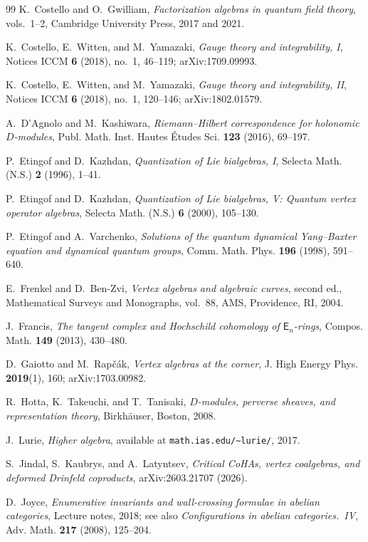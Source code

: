 \documentclass[11pt,reqno]{amsart}
\theoremstyle{definition}
\theoremstyle{remark}
\newcommand{\En}{\mathsf{E}_{n}}
\numberwithin{equation}{section}
\begin{document}
\begin{thebibliography}{99}
K.~Costello and O.~Gwilliam,
\emph{Factorization algebras in quantum field theory},
vols.~1--2, Cambridge University Press, 2017 and 2021.

K.~Costello, E.~Witten, and M.~Yamazaki,
\emph{Gauge theory and integrability, I},
Notices ICCM \textbf{6} (2018), no.~1, 46--119;
arXiv:1709.09993.

K.~Costello, E.~Witten, and M.~Yamazaki,
\emph{Gauge theory and integrability, II},
Notices ICCM \textbf{6} (2018), no.~1, 120--146;
arXiv:1802.01579.

A.~D'Agnolo and M.~Kashiwara,
\emph{Riemann--Hilbert correspondence for holonomic
$D$-modules},
Publ. Math. Inst. Hautes \'Etudes Sci. \textbf{123}
(2016), 69--197.

P.~Etingof and D.~Kazhdan,
\emph{Quantization of Lie bialgebras, I},
Selecta Math. (N.S.) \textbf{2} (1996), 1--41.

P.~Etingof and D.~Kazhdan,
\emph{Quantization of Lie bialgebras, V: Quantum vertex
operator algebras},
Selecta Math. (N.S.) \textbf{6} (2000), 105--130.

P.~Etingof and A.~Varchenko,
\emph{Solutions of the quantum dynamical Yang--Baxter
equation and dynamical quantum groups},
Comm. Math. Phys. \textbf{196} (1998), 591--640.

E.~Frenkel and D.~Ben-Zvi,
\emph{Vertex algebras and algebraic curves},
second ed., Mathematical Surveys and Monographs, vol.~88,
AMS, Providence, RI, 2004.

J.~Francis,
\emph{The tangent complex and Hochschild cohomology of
$\En$-rings},
Compos. Math. \textbf{149} (2013), 430--480.

D.~Gaiotto and M.~Rap\v{c}\'ak,
\emph{Vertex algebras at the corner},
J. High Energy Phys. \textbf{2019}(1), 160;
arXiv:1703.00982.

R.~Hotta, K.~Takeuchi, and T.~Tanisaki,
\emph{$D$-modules, perverse sheaves, and representation
theory},
Birkh\"auser, Boston, 2008.

J.~Lurie,
\emph{Higher algebra},
available at \texttt{math.ias.edu/\textasciitilde lurie/},
2017.

S.~Jindal, S.~Kaubrys, and A.~Latyntsev,
\emph{Critical CoHAs, vertex coalgebras, and deformed
Drinfeld coproducts},
arXiv:2603.21707 (2026).

D.~Joyce,
\emph{Enumerative invariants and wall-crossing formulae
in abelian categories},
Lecture notes, 2018; see also
\emph{Configurations in abelian categories.~IV},
Adv. Math. \textbf{217} (2008), 125--204.


\end{thebibliography}
\end{document}
